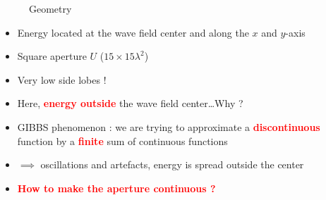 \documentclass[UKenglish,8pt,aspectratio=1610]{beamer}
\begin{document}
\begin{frame}
\begin{columns}
\begin{column}{0.5\textwidth}
\begin{figure}[h!]
			\centering
			\caption{Geometry}
				\end{figure}
			\vspace{-10pt}
				\begin{itemize}
					\item Energy located at the wave field center and along the $x$ and $y$-axis 
					\item Square aperture $U$ ($15\times 15\lambda^2$) %
					\item Very low side lobes ! 
					\item Here, \textbf{\textcolor{red}{energy outside}} the wave field center\dots Why ?
					\item \textsc{GIBBS} phenomenon : we are trying to approximate a \textbf{\textcolor{red}{discontinuous}} function by a \textbf{\textcolor{red}{finite}} sum of continuous functions
					\item $\implies$ oscillations and artefacts, energy is spread outside the center
					\item \textcolor{red}{\textbf{How to make the aperture continuous ?}}
				\end{itemize}
			\end{column}
		\end{columns} 
		
	\end{frame}
	
\end{document}
